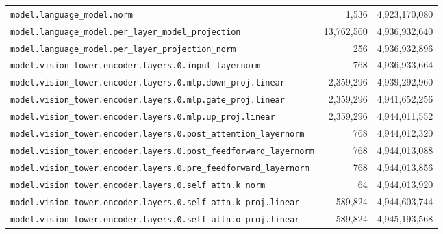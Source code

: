 \documentclass[10pt,a4paper]{article}
\theoremstyle{definition}
\begin{document}
\begin{appendices}
\begin{longtable}{p{9.5cm}rr}
\texttt{model.\allowbreak{}language\_model.\allowbreak{}norm} & 1,536 & 4,923,170,080 \\
\texttt{model.\allowbreak{}language\_model.\allowbreak{}per\_layer\_model\_projection} & 13,762,560 & 4,936,932,640 \\
\texttt{model.\allowbreak{}language\_model.\allowbreak{}per\_layer\_projection\_norm} & 256 & 4,936,932,896 \\
\texttt{model.\allowbreak{}vision\_tower.\allowbreak{}encoder.\allowbreak{}layers.\allowbreak{}0.\allowbreak{}input\_layernorm} & 768 & 4,936,933,664 \\
\texttt{model.\allowbreak{}vision\_tower.\allowbreak{}encoder.\allowbreak{}layers.\allowbreak{}0.\allowbreak{}mlp.\allowbreak{}down\_proj.\allowbreak{}linear} & 2,359,296 & 4,939,292,960 \\
\texttt{model.\allowbreak{}vision\_tower.\allowbreak{}encoder.\allowbreak{}layers.\allowbreak{}0.\allowbreak{}mlp.\allowbreak{}gate\_proj.\allowbreak{}linear} & 2,359,296 & 4,941,652,256 \\
\texttt{model.\allowbreak{}vision\_tower.\allowbreak{}encoder.\allowbreak{}layers.\allowbreak{}0.\allowbreak{}mlp.\allowbreak{}up\_proj.\allowbreak{}linear} & 2,359,296 & 4,944,011,552 \\
\texttt{model.\allowbreak{}vision\_tower.\allowbreak{}encoder.\allowbreak{}layers.\allowbreak{}0.\allowbreak{}post\_attention\_layernorm} & 768 & 4,944,012,320 \\
\texttt{model.\allowbreak{}vision\_tower.\allowbreak{}encoder.\allowbreak{}layers.\allowbreak{}0.\allowbreak{}post\_feedforward\_layernorm} & 768 & 4,944,013,088 \\
\texttt{model.\allowbreak{}vision\_tower.\allowbreak{}encoder.\allowbreak{}layers.\allowbreak{}0.\allowbreak{}pre\_feedforward\_layernorm} & 768 & 4,944,013,856 \\
\texttt{model.\allowbreak{}vision\_tower.\allowbreak{}encoder.\allowbreak{}layers.\allowbreak{}0.\allowbreak{}self\_attn.\allowbreak{}k\_norm} & 64 & 4,944,013,920 \\
\texttt{model.\allowbreak{}vision\_tower.\allowbreak{}encoder.\allowbreak{}layers.\allowbreak{}0.\allowbreak{}self\_attn.\allowbreak{}k\_proj.\allowbreak{}linear} & 589,824 & 4,944,603,744 \\
\texttt{model.\allowbreak{}vision\_tower.\allowbreak{}encoder.\allowbreak{}layers.\allowbreak{}0.\allowbreak{}self\_attn.\allowbreak{}o\_proj.\allowbreak{}linear} & 589,824 & 4,945,193,568 \\

\end{longtable}
\end{appendices}
\end{document}
